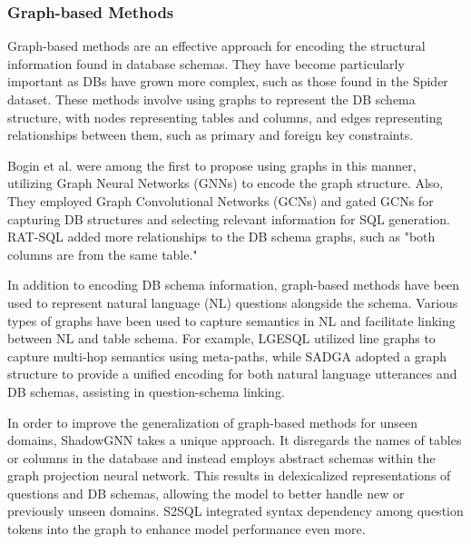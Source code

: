 \subsubsection{Graph-based Methods}

Graph-based methods are an effective approach for encoding the structural information found in database schemas. They have become particularly important as DBs have grown more complex, such as those found in the Spider dataset. These methods involve using graphs to represent the DB schema structure, with nodes representing tables and columns, and edges representing relationships between them, such as primary and foreign key constraints.

Bogin et al.\cite{bogin-etal-2019-representing} were among the first to propose using graphs in this manner, utilizing Graph Neural Networks (GNNs)\cite{li2017gated} to encode the graph structure. Also, They employed Graph Convolutional Networks (GCNs) and gated GCNs for capturing DB structures and selecting relevant information for SQL generation. RAT-SQL\cite{wang_rat_sql_2021} added more relationships to the DB schema graphs, such as "both columns are from the same table."

In addition to encoding DB schema information, graph-based methods have been used to represent natural language (NL) questions alongside the schema. Various types of graphs have been used to capture semantics in NL and facilitate linking between NL and table schema. For example, LGESQL\cite{cao-etal-2021-lgesql} utilized line graphs to capture multi-hop semantics using meta-paths, while SADGA\cite{cai_sadga_2022} adopted a graph structure to provide a unified encoding for both natural language utterances and DB schemas, assisting in question-schema linking.

In order to improve the generalization of graph-based methods for unseen domains, ShadowGNN \cite{chen-etal-2021-shadowgnn} takes a unique approach. It disregards the names of tables or columns in the database and instead employs abstract schemas within the graph projection neural network. This results in delexicalized representations of questions and DB schemas, allowing the model to better handle new or previously unseen domains.
S2SQL\cite{hui2022s2sql} integrated syntax dependency among question tokens into the graph to enhance model performance even more.

